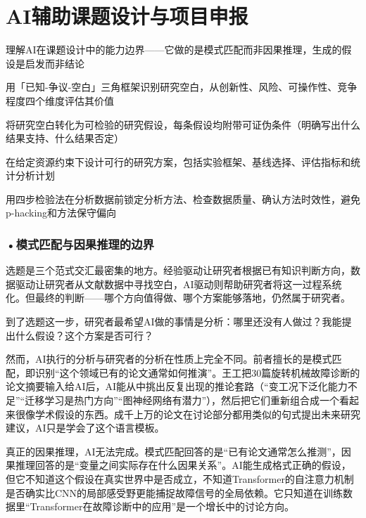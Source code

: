 \section{AI辅助课题设计与项目申报}
\label{sec:5.3}

\begin{sectionkeypoints}
\item 理解AI在课题设计中的能力边界——它做的是模式匹配而非因果推理，生成的假设是启发而非结论
\item 用「已知-争议-空白」三角框架识别研究空白，从创新性、风险、可操作性、竞争程度四个维度评估其价值
\item 将研究空白转化为可检验的研究假设，每条假设均附带可证伪条件（明确写出什么结果支持、什么结果否定）
\item 在给定资源约束下设计可行的研究方案，包括实验框架、基线选择、评估指标和统计分析计划
\item 用四步检验法在分析数据前锁定分析方法、检查数据质量、确认方法时效性，避免p-hacking和方法保守偏向
\end{sectionkeypoints}

\subsubsection*{\textbf{•模式匹配与因果推理的边界}}

选题是三个范式交汇最密集的地方。经验驱动让研究者根据已有知识判断方向，数据驱动让研究者从文献数据中寻找空白，AI驱动则帮助研究者将这一过程系统化。但最终的判断——哪个方向值得做、哪个方案能够落地，仍然属于研究者。

到了选题这一步，研究者最希望AI做的事情是分析：哪里还没有人做过？我能提出什么假设？这个方案是否可行？

然而，AI执行的分析与研究者的分析在性质上完全不同。前者擅长的是模式匹配，即识别``这个领域已有的论文通常如何推演''。王工把30篇旋转机械故障诊断的论文摘要输入给AI后，AI能从中挑出反复出现的推论套路（``变工况下泛化能力不足''``迁移学习是热门方向''``图神经网络有潜力''），然后把它们重新组合成一个看起来很像学术假设的东西。成千上万的论文在讨论部分都用类似的句式提出未来研究建议，AI只是学会了这个语言模板。

真正的因果推理，AI无法完成。模式匹配回答的是``已有论文通常怎么推测''，因果推理回答的是``变量之间实际存在什么因果关系''。AI能生成格式正确的假设，但它不知道这个假设在真实世界中是否成立，不知道Transformer的自注意力机制是否确实比CNN的局部感受野更能捕捉故障信号的全局依赖。它只知道在训练数据里``Transformer在故障诊断中的应用''是一个增长中的讨论方向。


